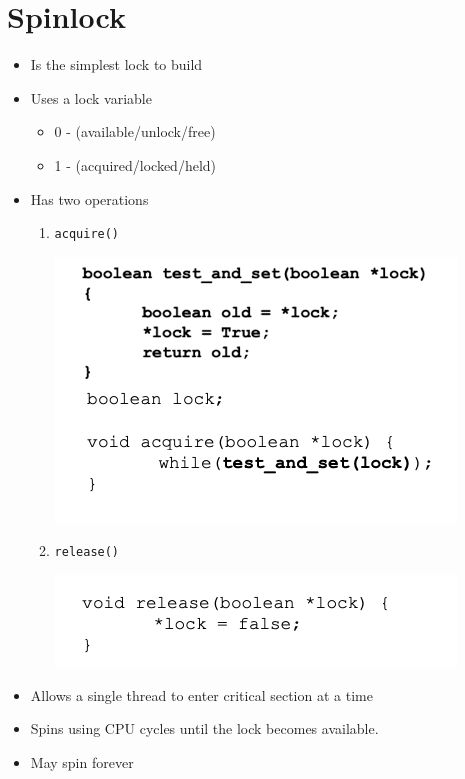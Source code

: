 \documentclass[12pt]{article}
\begin{document}
\section{Spinlock}
\begin{itemize}
    \item Is the simplest lock to build
    \item Uses a lock variable

    \begin{itemize}
        \item 0 - (available/unlock/free)
        \item 1 - (acquired/locked/held)
    \end{itemize}

    \item Has two operations

    \begin{enumerate}[1.]
        \item \texttt{acquire()}

        \bigskip

        \begin{center}
        \includegraphics[width=0.7\linewidth]{images/midterm_2_solution_3.png}
        \end{center}

        \bigskip

        \item \texttt{release()}

        \bigskip

        \begin{center}
        \includegraphics[width=0.7\linewidth]{images/midterm_2_solution_4.png}
        \end{center}

        \bigskip
    \end{enumerate}
    \item Allows a single thread to enter critical section at a time
    \item Spins using CPU cycles until the lock becomes available.
    \item May spin forever
\end{itemize}
\end{document}
